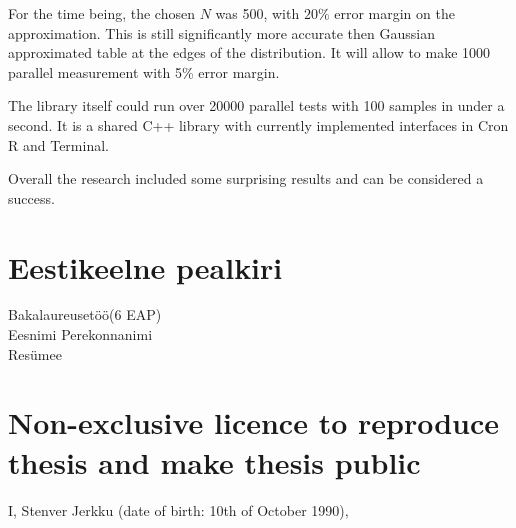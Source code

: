 \documentclass[12pt]{article}
\begin{document}
For the time being, the chosen $N$ was 500, with $20\%$ error margin on the approximation. This is still significantly more accurate then Gaussian approximated table at the edges of the distribution. It will allow to make 1000 parallel measurement with 5\% error margin.

The library itself could run over 20000 parallel tests with 100 samples in under a second. It is a shared C++ library with currently implemented interfaces in Cron R and Terminal.

Overall the research included some surprising results and can be considered a success.

\newpage


\section{Eestikeelne pealkiri}
Bakalaureusetöö(6 EAP) \\
Eesnimi Perekonnanimi \\
Resümee \\



\newpage




\appendix
\pagebreak

\section*{\small Non-exclusive licence to reproduce thesis and make thesis public}

I, Stenver Jerkku (date of birth: 10th of October 1990),
\end{document}
